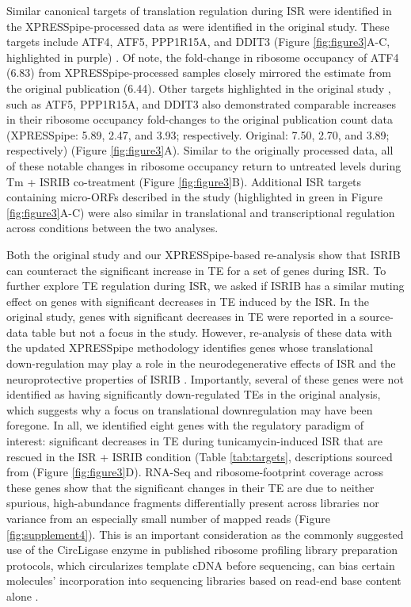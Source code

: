 \documentclass[10pt, oneside]{article}
\begin{document}
\begin{multicols}{2}
Similar canonical targets of translation regulation during ISR were identified in the XPRESSpipe-processed data as were identified in the original study. These targets include ATF4, ATF5, PPP1R15A, and DDIT3 (Figure \ref{fig:figure3}A-C, highlighted in purple) \cite{isrib_riboseq}. Of note, the fold-change in ribosome occupancy of ATF4 (6.83) from XPRESSpipe-processed samples closely mirrored the estimate from the original publication (6.44). Other targets highlighted in the original study \cite{isrib_riboseq}, such as ATF5, PPP1R15A, and DDIT3 also demonstrated comparable increases in their ribosome occupancy fold-changes to the original publication count data (XPRESSpipe: 5.89, 2.47, and 3.93; respectively. Original: 7.50, 2.70, and 3.89; respectively) (Figure \ref{fig:figure3}A). Similar to the originally processed data, all of these notable changes in ribosome occupancy return to untreated levels during Tm + ISRIB co-treatment (Figure \ref{fig:figure3}B). Additional ISR targets containing micro-ORFs described in the study (highlighted in green in Figure \ref{fig:figure3}A-C) were also similar in translational and transcriptional regulation across conditions between the two analyses. \par

Both the original study and our XPRESSpipe-based re-analysis show that ISRIB can counteract the significant increase in TE for a set of genes during ISR. To further explore TE regulation during ISR, we asked if ISRIB has a similar muting effect on genes with significant decreases in TE induced by the ISR. In the original study, genes with significant decreases in TE were reported in a source-data table but not a focus in the study. However, re-analysis of these data with the updated XPRESSpipe methodology identifies genes whose translational down-regulation may play a role in the neurodegenerative effects of ISR and the neuroprotective properties of ISRIB \cite{isrib_neuroprotective,isrib_neuroprotective2,isrib_neuroprotective3,isrib_neuroprotective4}. Importantly, several of these genes were not identified as having significantly down-regulated TEs in the original analysis, which suggests why a focus on translational downregulation may have been foregone. In all, we identified eight genes with the regulatory paradigm of interest: significant decreases in TE during tunicamycin-induced ISR that are rescued in the ISR + ISRIB condition (Table \ref{tab:targets}, descriptions sourced from \cite{genecards, ncbi, uniprot} (Figure \ref{fig:figure3}D). RNA-Seq and ribosome-footprint coverage across these genes show that the significant changes in their TE are due to neither spurious, high-abundance fragments differentially present across libraries nor variance from an especially small number of mapped reads (Figure \ref{fig:supplement4}). This is an important consideration as the commonly suggested use of the CircLigase enzyme in published ribosome profiling library preparation protocols, which circularizes template cDNA before sequencing, can bias certain molecules' incorporation into sequencing libraries based on read-end base content alone \cite{circligase_bias}. \par


\end{multicols}
\end{document}
